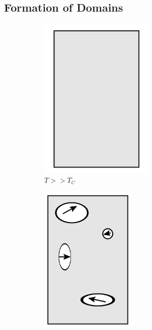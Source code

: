 \documentclass{book}
\begin{document}
\subsection{Formation of Domains}
\begin{figure}
	\centering
	\begin{subfigure}{0.3\textwidth}
		\centering
		\includegraphics[width=0.6\textwidth]{T_T_C.png}
		\caption{$T >> T_C$}
		\label{fig:t=tc}
	\end{subfigure}
	\begin{subfigure}{0.3\textwidth}
		\centering
		\includegraphics[width=0.5\textwidth]{T=T_c - Epsilon.png}

\end{subfigure}
\end{figure}
\end{document}
